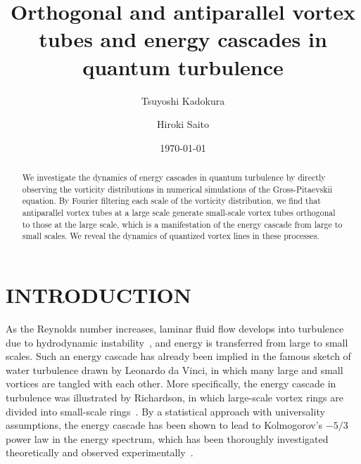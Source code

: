 \documentclass[aps,onecolumn,pra,longbibliography]{revtex4}
\begin{document}
	\title{Orthogonal and antiparallel vortex tubes and energy cascades in quantum turbulence}
	\author{Tsuyoshi Kadokura}
	\author{Hiroki Saito}
	\date{\today}
	\begin{abstract}
		We investigate the dynamics of energy cascades in quantum turbulence
		by directly observing the vorticity distributions
		in numerical simulations of the Gross-Pitaevskii equation.
		By Fourier filtering each scale of the vorticity distribution,
		we find that antiparallel vortex tubes at a large scale generate
		small-scale vortex tubes orthogonal to those at the large scale,
		which is a manifestation of the energy cascade from large to small scales.
		We reveal the dynamics of quantized vortex lines in these processes.
	\end{abstract}
	\maketitle

	\section{INTRODUCTION}
	\label{s:introduction}
	As the Reynolds number increases, laminar fluid flow develops into turbulence
	due to hydrodynamic instability~\cite{O.Reynolds},
	and energy is transferred from large to small scales.
	Such an energy cascade has already been implied in the famous sketch of
	water turbulence drawn by Leonardo da Vinci,
	in which many large and small vortices
	are tangled with each other.
	More specifically, the energy cascade in turbulence
	was illustrated by Richardson, in which large-scale vortex rings
	are divided into
	small-scale rings~\cite{L.F.Richardson}.
	By a statistical approach with universality assumptions,
	the energy cascade has been shown to lead to Kolmogorov's $-5/3$ power law
	in the energy spectrum, which has been thoroughly investigated theoretically
	and observed experimentally~\cite{U.Frisch1, A.N.Kolmogorov, G.K.Batchelor,
	T.Tatsumi, R.H.Kraichinan, U.Frisch2, S.Goto1, S.Goto2}.
\end{document}
